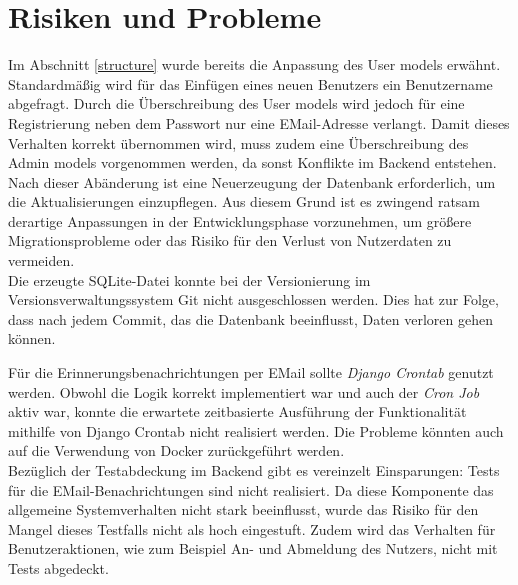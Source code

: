 \documentclass[conference]{IEEEtran}
\begin{document}
\section{Risiken und Probleme}
Im Abschnitt \ref{structure} wurde bereits die Anpassung des User models erwähnt. Standardmäßig wird für das Einfügen eines neuen Benutzers ein Benutzername abgefragt. Durch die Überschreibung des User models wird jedoch für eine Registrierung neben dem Passwort nur eine EMail-Adresse verlangt. Damit dieses Verhalten korrekt übernommen wird, muss zudem eine Überschreibung des Admin models vorgenommen werden, da sonst Konflikte im Backend entstehen. Nach dieser Abänderung ist eine Neuerzeugung der Datenbank erforderlich, um die Aktualisierungen einzupflegen. Aus diesem Grund ist es zwingend ratsam derartige Anpassungen in der Entwicklungsphase vorzunehmen, um größere Migrationsprobleme oder das Risiko für den Verlust von Nutzerdaten zu vermeiden.\\
Die erzeugte SQLite-Datei konnte bei der Versionierung im Versionsverwaltungssystem Git nicht ausgeschlossen werden. Dies hat zur Folge, dass nach jedem Commit, das die Datenbank beeinflusst, Daten verloren gehen können.

Für die Erinnerungsbenachrichtungen per EMail sollte \textit{Django Crontab} genutzt werden. Obwohl die Logik korrekt implementiert war und auch der \textit{Cron Job} aktiv war, konnte die erwartete zeitbasierte Ausführung der Funktionalität mithilfe von Django Crontab nicht realisiert werden. Die Probleme könnten auch auf die Verwendung von Docker zurückgeführt werden.\\
Bezüglich der Testabdeckung im Backend gibt es vereinzelt Einsparungen: Tests für die EMail-Benachrichtungen sind nicht realisiert. Da diese Komponente das allgemeine Systemverhalten nicht stark beeinflusst, wurde das Risiko für den Mangel dieses Testfalls nicht als hoch eingestuft.
Zudem wird das Verhalten für Benutzeraktionen, wie zum Beispiel An- und Abmeldung des Nutzers, nicht mit Tests abgedeckt.
\end{document}
